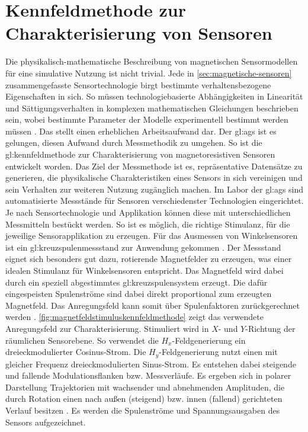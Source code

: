 %

\section{Kennfeldmethode zur Charakterisierung von Sensoren}\label{sec:kennfeldmethode-zur-charakterisierung}


Die physikalisch-mathematische Beschreibung von magnetischen Sensormodellen für eine simulative Nutzung ist nicht trivial. Jede in \autoref{sec:magnetische-sensoren} zusammengefasste Sensortechnologie birgt bestimmte verhaltensbezogene Eigenschaften in sich. So müssen technologiebasierte Abhängigkeiten in Linearität und Sättigungsverhalten in komplexen mathematischen Gleichungen beschrieben sein, wobei bestimmte Parameter der Modelle experimentell bestimmt werden müssen \cite{Schuethe2019}. Das stellt einen erheblichen Arbeitsaufwand dar. Der \gls{gl:ags} ist es gelungen, diesen Aufwand durch Messmethodik zu umgehen. So ist die \gls{gl:kennfeldmethode} zur Charakterisierung von magnetoresistiven Sensoren entwickelt worden. Das Ziel der Messmethode ist es, repräsentative Datensätze zu generieren, die physikalische Charakteristiken eines Sensors in sich vereinigen und sein Verhalten zur weiteren Nutzung zugänglich machen.
\newline
Im Labor der \gls{gl:ags} sind automatisierte Messstände für Sensoren verschiedenster Technologien eingerichtet. Je nach Sensortechnologie und Applikation können diese mit unterschiedlichen Messmitteln bestückt werden. So ist es möglich, die richtige Stimulanz, für die jeweilige Sensorapplikation zu erzeugen. Für das Ausmessen von Winkelsensoren ist ein \gls{gl:kreuzspulenmessstand} zur Anwendung gekommen \cite{Schuethe2019}\cite{Schuethe2020}. Der Messstand eignet sich besonders gut dazu, rotierende Magnetfelder zu erzeugen, was einer idealen Stimulanz für Winkelsensoren entspricht. Das Magnetfeld wird dabei durch ein speziell abgestimmtes \gls{gl:kreuzspulensystem} erzeugt. Die dafür eingespeisten Spulenströme sind dabei direkt proportional zum erzeugten Magnetfeld. Das Anregungsfeld kann somit über Spulenfaktoren zurückgerechnet werden \cite{Schuethe2020}.
\newline
\autoref{fig:magnetfeldstimuluskennfeldmethode} zeigt das verwendete Anregungsfeld zur Charakterisierung. Stimuliert wird in $X$- und $Y$-Richtung der räumlichen Sensorebene. So verwendet die $H_x$-Feldgenerierung ein dreieckmodulierter Cosinus-Strom. Die $H_y$-Feldgenerierung nutzt einen mit gleicher Frequenz dreieckmodulierten Sinus-Strom. Es entstehen dabei steigende und fallende Modulationsflanken bzw. Messverläufe. Es ergeben sich in polarer Darstellung Trajektorien mit wachsender und abnehmenden Amplituden, die durch Rotation einen nach außen (steigend) bzw. innen (fallend) gerichteten Verlauf besitzen \cite{Schuethe2019}. Es werden die Spulenströme und Spannungsausgaben des Sensors aufgezeichnet.
